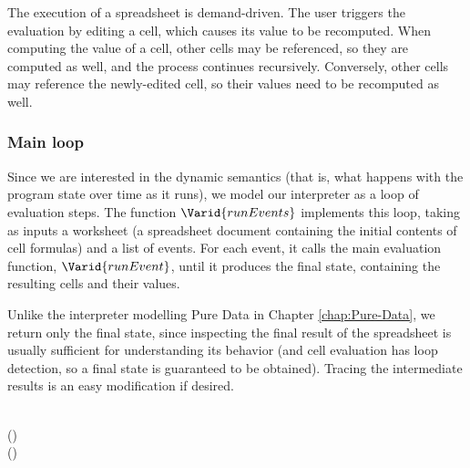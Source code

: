 The execution of a spreadsheet is demand-driven. The user triggers the
evaluation by editing a cell, which causes its value to be recomputed. When
computing the value of a cell, other cells may be referenced, so they are
computed as well, and the process continues recursively. Conversely,
other cells may reference the newly-edited cell, so their values need
to be recomputed as well.

\subsubsection{Main loop}

Since we are interested in the dynamic semantics (that is, what happens with
the program state over time as it runs), we model our interpreter as a loop of
evaluation steps. The function \ensuremath{\Varid{runEvents}} implements this loop, taking as
inputs a worksheet (a spreadsheet document containing the initial contents of
cell formulas) and a list of events. For each event, it calls the main
evaluation function, \ensuremath{\Varid{runEvent}}, until it produces the final state, containing
the resulting cells and their values.

Unlike the interpreter modelling Pure Data in Chapter \ref{chap:Pure-Data}, we
return only the final state, since inspecting the final result of the
spreadsheet is usually sufficient for understanding its behavior (and cell
evaluation has loop detection, so a final state is guaranteed to be obtained).
Tracing the intermediate results is an easy modification if desired.

\begin{hscode}\SaveRestoreHook
{}%
%
%
\>[B]{}\mathbin{::}\to {}\<[E]%
\\
\>[B]{}\;(\;)\;\mathrel{=}{}\<[E]%
\\
\>[B]{}\<[4]%
\>[4]{}\;\;(\;\;)\;\<[E]%
\ColumnHook
\end{hscode}\resethooks

